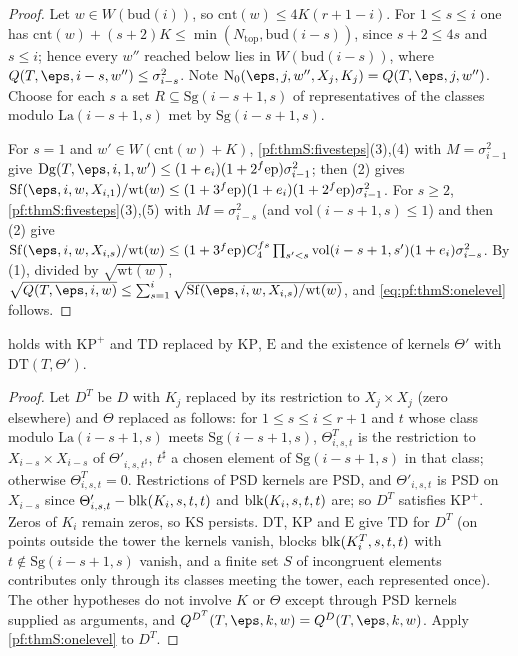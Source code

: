 \begin{proof}
Let $w\in W(\mathrm{bud}(i))$, so $\mathrm{cnt}(w)\le4K(r+1-i)$. For $1\le s\le i$ one has
$\mathrm{cnt}(w)+(s+2)K\le\min(N_{\mathrm{top}},\mathrm{bud}(i-s))$, since $s+2\le4s$ and $s\le i$; hence every $w''$
reached below lies in $W(\mathrm{bud}(i-s))$, where $Q(T,\eps,i-s,w'')\le\sigma_{i-s}^2$. Note
$\thmSNz(\eps,j,w'',X_j,K_j)=Q(T,\eps,j,w'')$. Choose for each $s$ a set $R\subseteq\mathrm{Sg}(i-s+1,s)$ of
representatives of the classes modulo $\mathrm{La}(i-s+1,s)$ met by $\mathrm{Sg}(i-s+1,s)$.

For $s=1$ and $w'\in W(\mathrm{cnt}(w)+K)$, \cref{pf:thmS:fivesteps}(3),(4) with $M=\sigma_{i-1}^2$ give
$\thmSDg(T,\eps,i,1,w')\le(1+e_i)(1+2^f\mathrm{ep})\sigma_{i-1}^2$; then (2) gives
$\thmSSf(\eps,i,w,X_{i,1})/\mathrm{wt}(w)\le(1+3^f\mathrm{ep})(1+e_i)(1+2^f\mathrm{ep})\sigma_{i-1}^2$. For $s\ge2$,
\cref{pf:thmS:fivesteps}(3),(5) with $M=\sigma_{i-s}^2$ (and $\mathrm{vol}(i-s+1,s)\le1$) and then (2) give
$\thmSSf(\eps,i,w,X_{i,s})/\mathrm{wt}(w)\le(1+3^f\mathrm{ep})C_4^{fs}\prod_{s'<s}\mathrm{vol}(i-s+1,s')(1+e_i)\sigma_{i-s}^2$.
By (1), divided by $\sqrt{\mathrm{wt}(w)}$, $\sqrt{Q(T,\eps,i,w)}\le\sum_{s=1}^i\sqrt{\thmSSf(\eps,i,w,X_{i,s})/\mathrm{wt}(w)}$,
and \eqref{eq:pf:thmS:onelevel} follows.
\end{proof}

\begin{corollary}\label{pf:thmS:onelevelafter}
 holds with $\mathrm{KP}^{+}$ and $\mathrm{TD}$ replaced by $\mathrm{KP}$,
$\mathrm{E}$ and the existence of kernels $\Theta'$ with $\mathrm{DT}(T,\Theta')$.
\end{corollary}

\begin{proof}
Let $D^T$ be $D$ with $K_j$ replaced by its restriction to $X_j\times X_j$ (zero elsewhere) and $\Theta$ replaced as
follows: for $1\le s\le i\le r+1$ and $t$ whose class modulo $\mathrm{La}(i-s+1,s)$ meets $\mathrm{Sg}(i-s+1,s)$,
$\Theta^T_{i,s,t}$ is the restriction to $X_{i-s}\times X_{i-s}$ of $\Theta'_{i,s,t^\sharp}$, $t^\sharp$ a chosen element of
$\mathrm{Sg}(i-s+1,s)$ in that class; otherwise $\Theta^T_{i,s,t}=0$. Restrictions of PSD kernels are PSD, and
$\Theta'_{i,s,t}$ is PSD on $X_{i-s}$ since $\Theta'_{i,s,t}-\operatorname{blk}(K_i,s,t,t)$ and $\operatorname{blk}(K_i,s,t,t)$ are; so $D^T$
satisfies $\mathrm{KP}^{+}$. Zeros of $K_i$ remain zeros, so $\mathrm{KS}$ persists. $\mathrm{DT}$,
$\mathrm{KP}$ and $\mathrm{E}$ give $\mathrm{TD}$ for $D^T$ (on points outside the tower the kernels
vanish, blocks $\operatorname{blk}(K^T_i,s,t,t)$ with $t\notin\mathrm{Sg}(i-s+1,s)$ vanish, and a finite set $S$ of incongruent
elements contributes only through its classes meeting the tower, each represented once). The other hypotheses do not involve $K$ or $\Theta$ except through PSD kernels supplied as
arguments, and $Q^{D^T}(T,\eps,k,w)=Q^D(T,\eps,k,w)$. Apply \cref{pf:thmS:onelevel} to $D^T$.
\end{proof}


